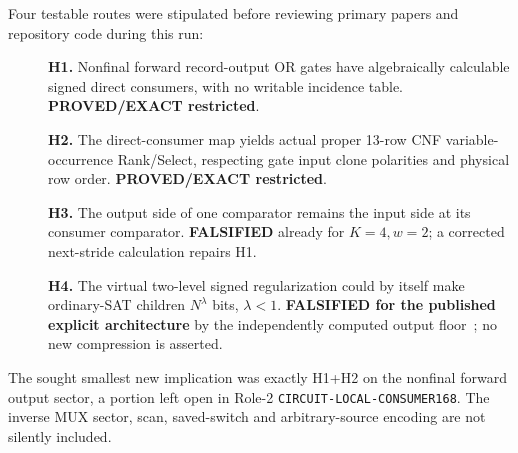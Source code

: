 \documentclass[11pt]{article}
\begin{document}
Four testable routes were stipulated before reviewing primary papers and
repository code during this run:
\begin{description}
\item[] \textbf{H1.} Nonfinal forward record-output OR gates have
algebraically calculable signed direct consumers, with no writable
incidence table.  \textbf{PROVED/EXACT restricted}.
\item[] \textbf{H2.} The direct-consumer map yields actual proper
13-row CNF variable-occurrence Rank/Select, respecting gate input
clone polarities and physical row order. \textbf{PROVED/EXACT restricted}.
\item[] \textbf{H3.} The output side of one comparator remains the
input side at its consumer comparator. \textbf{FALSIFIED} already for
$K=4,w=2$; a corrected next-stride calculation repairs H1.
\item[] \textbf{H4.} The virtual two-level signed regularization could
by itself make ordinary-SAT children $N^{\lambda}$ bits,
$\lambda<1$. \textbf{FALSIFIED for the published explicit architecture}
by the independently computed output floor~\cite{floor131}; no new
compression is asserted.
\end{description}
The sought smallest new implication was exactly H1+H2 on the
nonfinal forward output sector, a portion left open in Role-2
\texttt{CIRCUIT-LOCAL-CONSUMER168}.  The inverse MUX sector, scan,
saved-switch and arbitrary-source encoding are not silently included.
\end{document}
